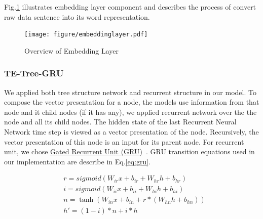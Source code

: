 Fig.\ref{fig:embeddinglayer} illustrates embedding layer component and describes the process of convert raw data sentence into its word representation.

\begin{figure}[H]
    \centering
    \texttt{[image: figure/embeddinglayer.pdf]}
    \caption[Overview of embedding layer]{Overview of Embedding Layer}
    \label{fig:embeddinglayer}
\end{figure}



\subsubsection{TE-Tree-GRU}
We applied both tree structure network and recurrent structure in our model.
To compose the vector presentation for a node, the models use information from that node and it child nodes (if it has any), we applied recurrent network over the the node and all its child nodes.
The hidden state of the last Recurrent Neural Network time step is viewed as a vector presentation of the node.
Recursively, the vector presentation of this node is an input for its parent node.
For recurrent unit, we chose \hyperref[sec:GRU]{Gated Recurrent Unit (GRU)}~\cite{cho2014learning}.
GRU transition equations used in our implementation are describe in Eq.\ref{eq:gru}.

\begin{equation}
\label{eq:gru}
\begin{aligned}
&r = sigmoid(W_{ir} x + b_{ir} + W_{hr} h + b_{hr}) \\
&i = sigmoid(W_{ii} x + b_{ii} + W_{hi} h + b_{hi}) \\
&n = \tanh(W_{in} x + b_{in} + r * (W_{hn} h + b_{hn})) \\
&h' = (1 - i) * n + i * h\\
\end{aligned}
\end{equation}

